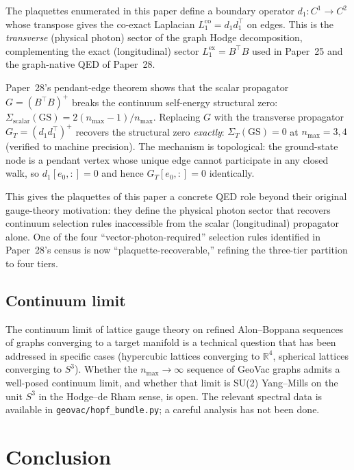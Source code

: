 \documentclass[11pt]{article}
\begin{document}
The plaquettes enumerated in this paper define a boundary operator
$d_1\colon C^1 \to C^2$ whose transpose gives the co-exact Laplacian
$L_1^{\mathrm{co}} = d_1 d_1^\top$ on edges.  This is the
\emph{transverse} (physical photon) sector of the graph Hodge
decomposition, complementing the exact (longitudinal) sector
$L_1^{\mathrm{ex}} = B^\top B$ used in Paper~25 and the graph-native
QED of Paper~28.

Paper~28's pendant-edge theorem shows that the scalar propagator
$G = (B^\top B)^+$ breaks the continuum self-energy structural zero:
$\Sigma_{\mathrm{scalar}}(\mathrm{GS}) = 2(n_{\max}-1)/n_{\max}$.
Replacing $G$ with the transverse propagator
$G_T = (d_1 d_1^\top)^+$ recovers the structural zero \emph{exactly}:
$\Sigma_T(\mathrm{GS}) = 0$ at $n_{\max} = 3, 4$ (verified to machine
precision).  The mechanism is topological: the ground-state node is a
pendant vertex whose unique edge cannot participate in any closed walk,
so $d_1[e_0, :] = 0$ and hence $G_T[e_0, :] = 0$ identically.

This gives the plaquettes of this paper a concrete QED role beyond
their original gauge-theory motivation: they define the physical photon
sector that recovers continuum selection rules inaccessible from the
scalar (longitudinal) propagator alone.  One of the four
``vector-photon-required'' selection rules identified in Paper~28's
census is now ``plaquette-recoverable,'' refining the three-tier
partition to four tiers.

\subsection{Continuum limit}

The continuum limit of lattice gauge theory on refined Alon--Boppana
sequences of graphs converging to a target manifold is a technical
question that has been addressed in specific cases (hypercubic
lattices converging to $\mathbb{R}^4$, spherical lattices converging
to $S^3$).  Whether the $n_{\max} \to \infty$ sequence of GeoVac
graphs admits a well-posed continuum limit, and whether that limit is
SU(2) Yang--Mills on the unit $S^3$ in the Hodge--de Rham sense, is
open.  The relevant spectral data is available in
\texttt{geovac/hopf\_bundle.py}; a careful analysis has not been done.

\section{Conclusion}
\label{sec:conclusion}
\end{document}
